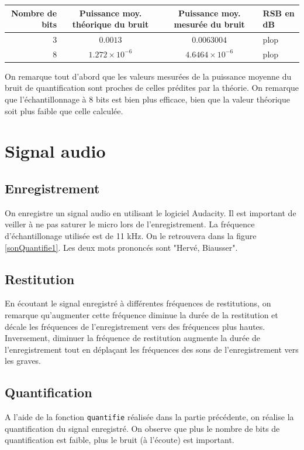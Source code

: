 \documentclass[french]{article}
\begin{document}
\begin{tabular}{r|c|c|l}
	Nombre de bits & Puissance moy. théorique du bruit & Puissance moy. mesurée du bruit & RSB en dB\\ 
	\hline
	3 & $0.0013$ & $0.0063004$ & plop \\ 
	\hline
	8 & $1.272 \times 10^{-6}$ & $4.6464\times 10^{-6}$ & plop
\end{tabular} 

On remarque tout d'abord que les valeurs mesurées de la puissance moyenne du bruit de quantification sont proches de celles prédites par la théorie. On remarque que l'échantillonnage à 8 bits est bien plus efficace, bien que la valeur théorique soit plus faible que celle calculée.

\FloatBarrier
\section{ Signal audio}

\subsection{Enregistrement}

On enregistre un signal audio en utilisant le logiciel Audacity. Il est important de veiller à ne pas saturer le micro lors de l'enregistrement. La fréquence d'échantillonage utilisée est de 11 kHz. On le retrouvera dans la figure \ref{sonQuantifie1}. Les deux mots prononcés sont "Hervé, Biausser".

\subsection{ Restitution}

En écoutant le signal enregistré à différentes fréquences de restitutions, on remarque qu'augmenter cette fréquence diminue la durée de la restitution et décale les fréquences de l'enregistrement vers des fréquences plus hautes. Inversement, diminuer la fréquence de restitution augmente la durée de l'enregistrement tout en déplaçant les fréquences des sons de l'enregistrement vers les graves.

\subsection{ Quantification}

A l'aide de la fonction \verb`quantifie` réalisée dans la partie précédente, on réalise la quantification du signal enregistré. On observe que plus le nombre de bits de quantification est faible, plus le bruit (à l'écoute) est important.
\end{document}
